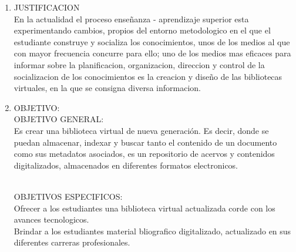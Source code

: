 \begin{enumerate}[1.]
\item JUSTIFICACION 
	\\ En la actualidad el proceso enseñanza - aprendizaje superior esta experimentando cambios, propios del entorno metodologico en el que el estudiante construye y socializa los conocimientos, unos de los medios al que con mayor frecuencia concurre para ello; uno de los medios mas eficaces para informar sobre la planificacion, organizacion, direccion y control de la socializacion de los conocimientos es la creacion y diseño de las bibliotecas virtuales, en la que se consigna diversa informacion.
	
\item OBJETIVO:
\\ OBJETIVO GENERAL:
\\ Es crear una biblioteca virtual de nueva generación.
Es decir, donde se puedan almacenar, indexar y buscar tanto el contenido de un documento como sus metadatos asociados, es un repositorio de acervos y contenidos digitalizados, almacenados en diferentes formatos electronicos.

\\ OBJETIVOS ESPECIFICOS:
\\ Ofrecer a los estudiantes una biblioteca virtual actualizada corde con los avances tecnologicos.
\\ Brindar a los estudiantes material bliografico digitalizado, actualizado en sus diferentes carreras profesionales.


\end{enumerate} 
